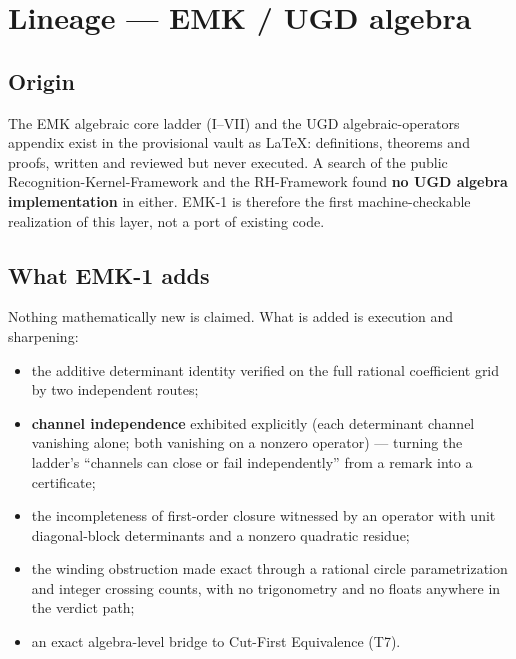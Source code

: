 \hypertarget{lineage-emk-ugd-algebra}{%
\chapter{Lineage --- EMK / UGD algebra}\label{lineage-emk-ugd-algebra}}

\hypertarget{origin}{%
\section{Origin}\label{origin}}

The EMK algebraic core ladder (I--VII) and the UGD algebraic-operators
appendix exist in the provisional vault as LaTeX: definitions, theorems
and proofs, written and reviewed but never executed. A search of the
public Recognition-Kernel-Framework and the RH-Framework found \textbf{no UGD
algebra implementation} in either. EMK-1 is therefore the first
machine-checkable realization of this layer, not a port of existing code.

\hypertarget{what-emk-1-adds}{%
\section{What EMK-1 adds}\label{what-emk-1-adds}}

Nothing mathematically new is claimed. What is added is execution and
sharpening:

\begin{itemize}
\tightlist
\item
  the additive determinant identity verified on the full rational
  coefficient grid by two independent routes;
\item
  \textbf{channel independence} exhibited explicitly (each determinant channel
  vanishing alone; both vanishing on a nonzero operator) --- turning the
  ladder's ``channels can close or fail independently'' from a remark into
  a certificate;
\item
  the incompleteness of first-order closure witnessed by an operator with
  unit diagonal-block determinants and a nonzero quadratic residue;
\item
  the winding obstruction made exact through a rational circle
  parametrization and integer crossing counts, with no trigonometry and
  no floats anywhere in the verdict path;
\item
  an exact algebra-level bridge to Cut-First Equivalence (T7).
\end{itemize}

